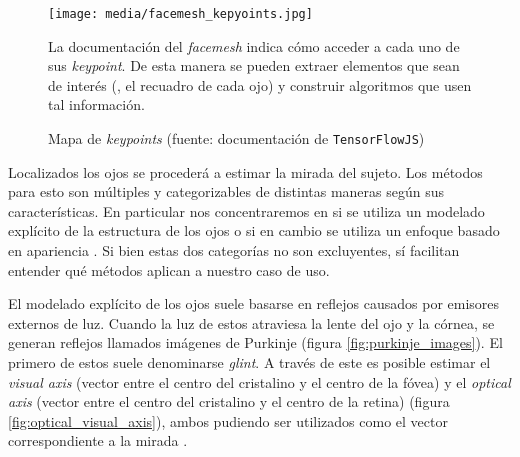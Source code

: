 \begin{figure}
    \centering
    \texttt{[image: media/facemesh\_kepyoints.jpg]}
    \caption{
        Mapa de \textit{keypoints}
        (fuente: documentación de \texttt{TensorFlowJS}\protect\footnotemark)
    }
    La documentación del \textit{facemesh} indica cómo acceder a cada uno de
    sus \textit{keypoint}.
    De esta manera se pueden extraer elementos que sean de interés (\eg, el
    recuadro de cada ojo) y construir algoritmos que usen tal información.
    \label{fig:facemesh_keypoints}
\end{figure}

Localizados los ojos se procederá a estimar la mirada del sujeto.
Los métodos para esto son múltiples y categorizables de distintas maneras según
sus características.
En particular nos concentraremos en si se utiliza un modelado explícito de la
estructura de los ojos o si en cambio se utiliza un enfoque basado en
apariencia \cite{hansen_2009_eye_of_the_beholder}.
Si bien estas dos categorías no son excluyentes, sí facilitan entender qué
métodos aplican a nuestro caso de uso.

El modelado explícito de los ojos suele basarse en reflejos causados por
emisores externos de luz.
Cuando la luz de estos atraviesa la lente del ojo y la córnea, se generan
reflejos llamados imágenes de Purkinje (figura \ref{fig:purkinje_images}).
El primero de estos suele denominarse \textit{glint}.
A través de este es posible estimar el \textit{visual axis} (vector entre el
centro del cristalino y el centro de la fóvea) y el \textit{optical axis}
(vector entre el centro del cristalino y el centro de la retina) (figura
\ref{fig:optical_visual_axis}), ambos pudiendo ser utilizados como el vector
correspondiente a la mirada \cite{hansen_2009_eye_of_the_beholder}.


